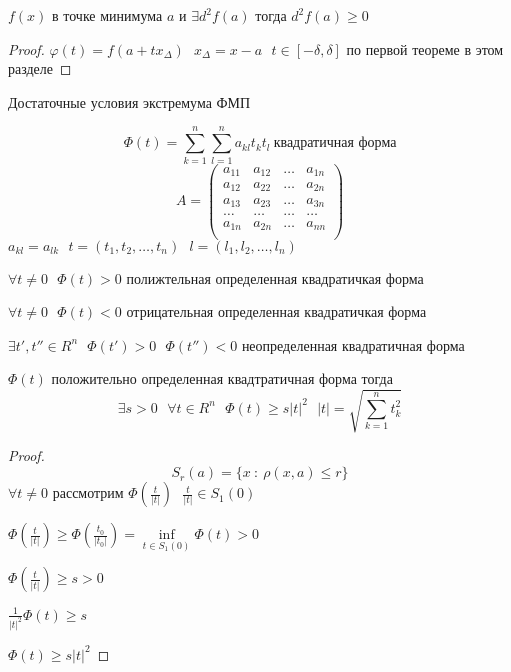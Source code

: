 \begin{theorem}
  $f(x)$ в точке минимума $a$ и $\exists d^2f(a)$ тогда $d^2f(a) \ge 0$
\end{theorem}

\begin{proof}
  $\varphi(t) = f(a + tx_{\Delta}) ~~~ x_{\Delta} = x - a ~~~
  t \in [-\delta, \delta]$ по первой теореме в этом разделе
\end{proof}

\begin{title}[\Large]
  Достаточные условия экстремума ФМП
\end{title}

\begin{define}
  $$
  \Phi(t) = \sum_{k=1}^n \sum_{l=1}^n a_{kl}t_k t_l ~
  \text{квадратичная форма}
  $$
  $$
  A = \left(
  \begin{array}{cccc}
    a_{11} & a_{12} & \ldots & a_{1n} \\
    a_{12} & a_{22} & \ldots & a_{2n} \\
    a_{13} & a_{23} & \ldots & a_{3n} \\
    \ldots & \ldots & \ldots & \ldots \\
    a_{1n} & a_{2n} & \ldots & a_{nn} \\
  \end{array}
  \right)
  $$
  $a_{kl} = a_{lk} ~~~ t = (t_1, t_2, \ldots, t_n) ~~~
  l = (l_1, l_2, \ldots, l_n)$

  $\forall t \not= 0 ~~~ \Phi(t) > 0$ полижтельная определенная квадратичкая
  форма

  $\forall t \not= 0 ~~~ \Phi(t) < 0$ отрицательная определенная квадратичкая
  форма

  $\exists t', t'' \in R^n ~~~ \Phi(t') > 0 ~~~ \Phi(t'') < 0$ неопределенная
  квадратичная форма
\end{define}

\begin{theorem}
  $\Phi(t)$ положительно определенная квадтратичная форма тогда
  $$
  \exists s > 0 ~~~ \forall t \in R^n ~~~ \Phi(t) \ge s|t|^2 ~~~
  |t| = \sqrt{\sum_{k=1}^n t_k^2}
  $$
\end{theorem}

\begin{proof}
  $$
  S_r(a) = \{x ~ : ~ \rho(x, a) \le r\}
  $$
  $\forall t \not= 0$ рассмотрим $\Phi \left( \frac{t}{|t|} \right) ~~~
  \frac{t}{|t|} \in S_1(0)$

  $\Phi \left( \frac{t}{|t|} \right) \ge \Phi \left( \frac{t_0}{|t_0|} \right) =
  \inf \limits_{t \in S_1(0)} \Phi(t) > 0$

  $\Phi \left( \frac{t}{|t|} \right) \ge s > 0$

  $\frac{1}{|t|^2} \Phi(t) \ge s$

  $\Phi(t) \ge s|t|^2$
\end{proof}

